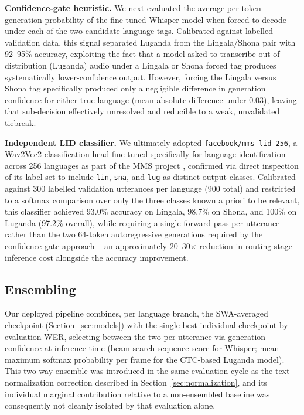 \documentclass[11pt]{article}
\begin{document}
\textbf{Confidence-gate heuristic.} We next evaluated the average per-token generation probability of the fine-tuned Whisper model when forced to decode under each of the two candidate language tags. Calibrated against labelled validation data, this signal separated Luganda from the Lingala/Shona pair with 92--95\% accuracy, exploiting the fact that a model asked to transcribe out-of-distribution (Luganda) audio under a Lingala or Shona forced tag produces systematically lower-confidence output. However, forcing the Lingala versus Shona tag specifically produced only a negligible difference in generation confidence for either true language (mean absolute difference under 0.03), leaving that sub-decision effectively unresolved and reducible to a weak, unvalidated tiebreak.

\textbf{Independent LID classifier.} We ultimately adopted \texttt{facebook/mms-lid-256}, a Wav2Vec2 classification head fine-tuned specifically for language identification across 256 languages as part of the MMS project \cite{pratap2024mms}, confirmed via direct inspection of its label set to include \texttt{lin}, \texttt{sna}, and \texttt{lug} as distinct output classes. Calibrated against 300 labelled validation utterances per language (900 total) and restricted to a softmax comparison over only the three classes known a priori to be relevant, this classifier achieved 93.0\% accuracy on Lingala, 98.7\% on Shona, and 100\% on Luganda (97.2\% overall), while requiring a single forward pass per utterance rather than the two 64-token autoregressive generations required by the confidence-gate approach -- an approximately 20--30$\times$ reduction in routing-stage inference cost alongside the accuracy improvement.

\subsection{Ensembling}
\label{sec:ensembling}

Our deployed pipeline combines, per language branch, the SWA-averaged checkpoint (Section~\ref{sec:models}) with the single best individual checkpoint by evaluation WER, selecting between the two per-utterance via generation confidence at inference time (beam-search sequence score for Whisper; mean maximum softmax probability per frame for the CTC-based Luganda model). This two-way ensemble was introduced in the same evaluation cycle as the text-normalization correction described in Section~\ref{sec:normalization}, and its individual marginal contribution relative to a non-ensembled baseline was consequently not cleanly isolated by that evaluation alone.
\end{document}
